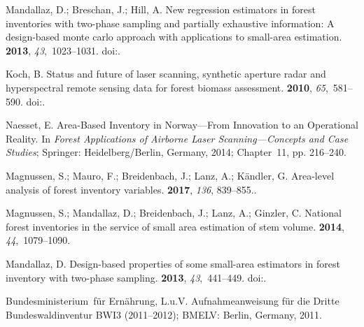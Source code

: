 \documentclass[remotesensing,article,accept,moreauthors,pdftex,10pt,a4paper]{Definitions/mdpi}
\begin{document}
\begin{thebibliography}{999}
Mandallaz, D.; Breschan, J.; Hill, A.
\newblock New regression estimators in forest inventories with two-phase
  sampling and partially exhaustive information: A design-based monte carlo
  approach with applications to small-area estimation.
 {\bf 2013}, {\em
  43},~1023--1031.
\newblock
doi:{\href{https://doi.org/10.1139/cjfr-2013-0181}{}}.

Koch, B.
\newblock Status and future of laser scanning, synthetic aperture radar and
  hyperspectral remote sensing data for forest biomass assessment.
 {\bf 2010},
  {\em 65},~581--590.
\newblock
  doi:{\href{https://doi.org/10.1016/j.isprsjprs.2010.09.001}{}}.

Naesset, E.
\newblock Area-Based Inventory in Norway---From Innovation to an Operational
  Reality. In {\em Forest Applications of Airborne Laser Scanning---Concepts
  and Case Studies}; Springer: Heidelberg/Berlin, Germany,  2014; Chapter~11, pp. 216--240.


Magnussen, S.; Mauro, F.; Breidenbach, J.; Lanz, A.; K{\"a}ndler, G.
\newblock Area-level analysis of forest inventory variables.
 {\bf 2017}, \emph{136}, 839--855..

Magnussen, S.; Mandallaz, D.; Breidenbach, J.; Lanz, A.; Ginzler, C.
\newblock National forest inventories in the service of small area estimation
  of stem volume.
 {\bf 2014}, {\em
  44},~1079--1090.

Mandallaz, D.
\newblock Design-based properties of some small-area estimators in forest
  inventory with two-phase sampling.
 {\bf 2013}, {\em
  43},~441--449.
\newblock
  doi:{\href{https://doi.org/10.1139/cjfr-2012-0381}{}}.

{B}undesministerium~für {E}rn{\"a}hrung, L.u.V.
\newblock Aufnahmeanweisung für die Dritte {B}undeswaldinventur {BWI3} (2011--2012); BMELV: Berlin, Germany, 2011.


\end{thebibliography}
\end{document}
